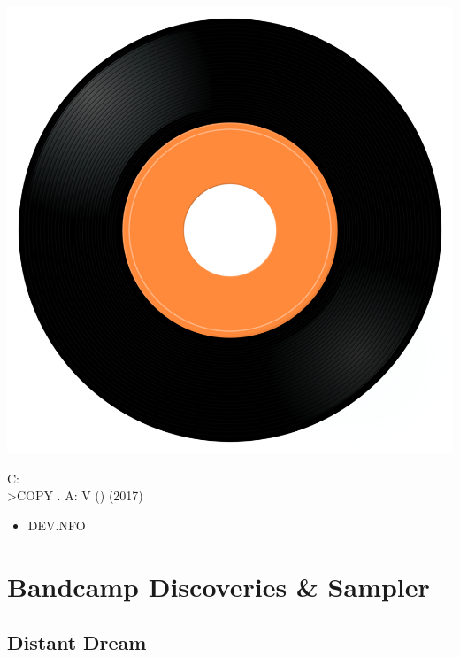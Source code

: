 \begin{minipage}[t]{0.25\textwidth}
\captionsetup{type=figure}
\includegraphics[width=\textwidth]{Images/cover.png}
\caption*{C:\\>COPY \*.\* A: \/V () (2017)}
\end{minipage}
\begin{minipage}[t]{0.25\textwidth}\vspace{0pt}
\begin{itemize}[nosep,leftmargin=1em,labelwidth=*,align=left]
	\setlength{\itemsep}{0pt}
	\item DEV.NFO
\end{itemize}
\end{minipage}


\section{Bandcamp Discoveries \& Sampler}

\subsection{Distant Dream}

